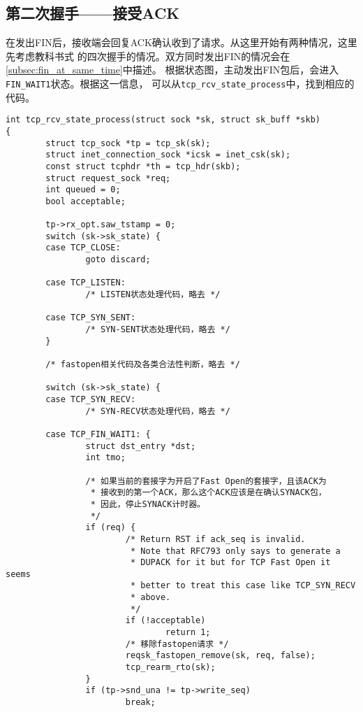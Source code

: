 \subsection{第二次握手——接受ACK}
在发出FIN后，接收端会回复ACK确认收到了请求。从这里开始有两种情况，这里先考虑教科书式
的四次握手的情况。双方同时发出FIN的情况会在\ref{subsec:fin_at_same_time}中描述。
根据状态图，主动发出FIN包后，会进入\texttt{FIN_WAIT1}状态。根据这一信息，
可以从\texttt{tcp_rcv_state_process}中，找到相应的代码。
\begin{verbatim}
int tcp_rcv_state_process(struct sock *sk, struct sk_buff *skb)
{
        struct tcp_sock *tp = tcp_sk(sk);
        struct inet_connection_sock *icsk = inet_csk(sk);
        const struct tcphdr *th = tcp_hdr(skb);
        struct request_sock *req;
        int queued = 0;
        bool acceptable;

        tp->rx_opt.saw_tstamp = 0;
        switch (sk->sk_state) {
        case TCP_CLOSE:
                goto discard;

        case TCP_LISTEN:
                /* LISTEN状态处理代码，略去 */

        case TCP_SYN_SENT:
                /* SYN-SENT状态处理代码，略去 */
        }

        /* fastopen相关代码及各类合法性判断，略去 */

        switch (sk->sk_state) {
        case TCP_SYN_RECV:
                /* SYN-RECV状态处理代码，略去 */
        
        case TCP_FIN_WAIT1: {
                struct dst_entry *dst;
                int tmo;

                /* 如果当前的套接字为开启了Fast Open的套接字，且该ACK为
                 * 接收到的第一个ACK，那么这个ACK应该是在确认SYNACK包，
                 * 因此，停止SYNACK计时器。
                 */
                if (req) {
                        /* Return RST if ack_seq is invalid.
                         * Note that RFC793 only says to generate a
                         * DUPACK for it but for TCP Fast Open it seems
                         * better to treat this case like TCP_SYN_RECV
                         * above.
                         */
                        if (!acceptable)
                                return 1;
                        /* 移除fastopen请求 */
                        reqsk_fastopen_remove(sk, req, false);
                        tcp_rearm_rto(sk);
                }
                if (tp->snd_una != tp->write_seq)
                        break;


\end{verbatim}
